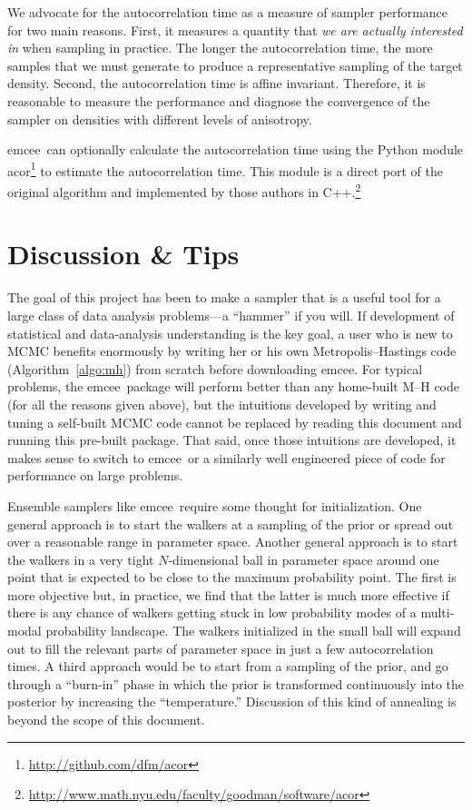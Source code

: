 \documentclass[12pt,preprint]{aastex}
\newcommand{\project}[1]{{\sffamily #1}}
\newcommand{\thisplain}{emcee}
\newcommand{\this}{\project{\thisplain}}
\newcommand{\sectlabel}[1]{\label{sect:#1}}
\newcommand{\Algo}[1]{Algorithm~\ref{algo:#1}}
\newcommand{\algo}[1]{\Algo{#1}}
\begin{document}
We advocate for the autocorrelation time as a measure of sampler
performance for two main reasons. First, it measures a quantity
that \emph{we are actually interested in} when sampling in practice.
The longer the autocorrelation time, the more samples that we must
generate to produce a representative sampling of the target
density. Second, the autocorrelation time is affine invariant. Therefore,
it is reasonable to measure the performance and diagnose the convergence
of the sampler on densities with different levels of anisotropy.

\this\ can optionally calculate the autocorrelation time using the Python
module \project{acor}\footnote{\url{http://github.com/dfm/acor}} to estimate
the autocorrelation time. This module is a direct port of the original
algorithm  and implemented by those
authors in
C++.\footnote{\url{http://www.math.nyu.edu/faculty/goodman/software/acor}}

\section{Discussion \& Tips}\sectlabel{advice}

The goal of this project has been to make a sampler that is a useful
tool for a large class of data analysis problems---a ``hammer'' if you
will.  If development of statistical and data-analysis understanding
is the key goal, a user who is new to MCMC benefits enormously by
writing her or his own Metropolis--Hastings code (\algo{mh}) from
scratch before downloading \this.  For typical problems, the
\this\ package will perform better than any home-built M--H code (for
all the reasons given above), but the intuitions developed by writing
and tuning a self-built MCMC code cannot be replaced by reading this
document and running this pre-built package.  That said, once those
intuitions are developed, it makes sense to switch to \this\ or a
similarly well engineered piece of code for performance on large
problems.

Ensemble samplers like \this\ require some thought for initialization.
One general approach is to start the walkers at a sampling of the
prior or spread out over a reasonable range in parameter space.
Another general approach is to start the walkers in a very tight
$N$-dimensional ball in parameter space around one point that is
expected to be close to the maximum probability point.  The first is
more objective but, in practice, we find that the latter is much more
effective if there is any chance of walkers getting stuck in low
probability modes of a multi-modal probability landscape.  The walkers
initialized in the small ball will expand out to fill the relevant
parts of parameter space in just a few autocorrelation times.  A third
approach would be to start from a sampling of the prior, and go
through a ``burn-in'' phase in which the prior is transformed
continuously into the posterior by increasing the ``temperature.''
Discussion of this kind of annealing is beyond the scope of this
document.
\end{document}

